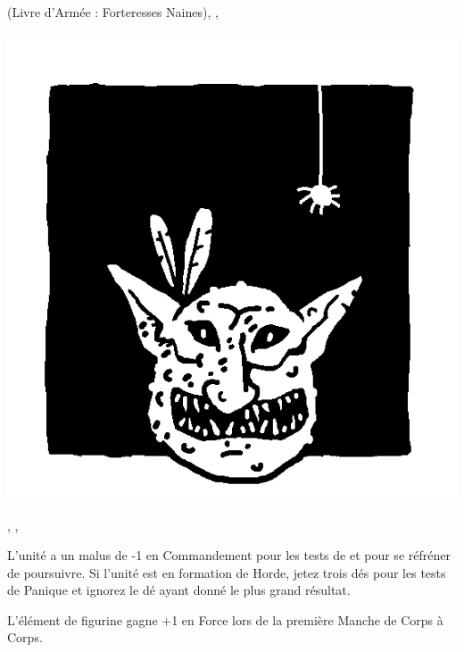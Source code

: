 \begin{multicols}{3}
\begin{center}
\hatred{} (Livre d'Armée : Forteresses Naines), \unruly{}, \insignificant{}
\end{center}

\columnbreak

\begin{center}
\includegraphics[width=\logosize]{pics/forestgoblin.png}
\vspace*{-1cm}\subsubtitle{\forestgoblin}

\strider{\forest}, \unruly{}, \insignificant{}
\end{center}

\end{multicols}

\armyspecialruleentry{\unruly}

L'unité a un malus de -1 en Commandement pour les tests de \frenzy{} et pour se réfréner de poursuivre. Si l'unité est en formation de Horde, jetez trois dés pour les tests de Panique et ignorez le dé ayant donné le plus grand résultat.

\armyspecialruleentry{\borntofight}

L'élément de figurine gagne +1 en Force lors de la première Manche de Corps à Corps.

